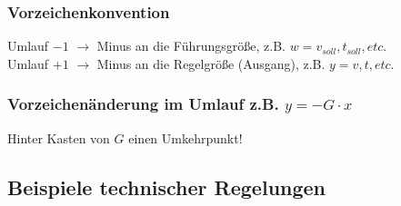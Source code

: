 \documentclass[12pt]{article}
\begin{document}
\subsubsection{Vorzeichenkonvention}
Umlauf \(-1\) \(\rightarrow\) Minus an die Führungsgröße, z.B.  \(w= v_{soll}, t_{soll}, etc\).
\\ Umlauf \(+1\) \(\rightarrow\) Minus an die Regelgröße (Ausgang), z.B.  \(y = v, t, etc\).
\subsubsection{Vorzeichenänderung im Umlauf z.B. \(y = - G\cdot x\)}
Hinter Kasten von \(G\) einen Umkehrpunkt!

\subsection{Beispiele technischer Regelungen}
\end{document}
